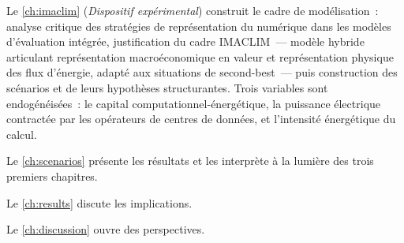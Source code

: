 Le \autoref{ch:imaclim} (\emph{Dispositif expérimental}) construit le cadre de modélisation~: analyse critique des stratégies de représentation du numérique dans les modèles d'évaluation intégrée, justification du cadre IMACLIM~--- modèle hybride articulant représentation macroéconomique en valeur et représentation physique des flux d'énergie, adapté aux situations de second-best~--- puis construction des scénarios et de leurs hypothèses structurantes. Trois variables sont endogénéisées~: le capital computationnel-énergétique, la puissance électrique contractée par les opérateurs de centres de données, et l'intensité énergétique du calcul.

Le \autoref{ch:scenarios} présente les résultats et les interprète à la lumière des trois premiers chapitres.

Le \autoref{ch:results} discute les implications.

Le \autoref{ch:discussion} ouvre des perspectives.